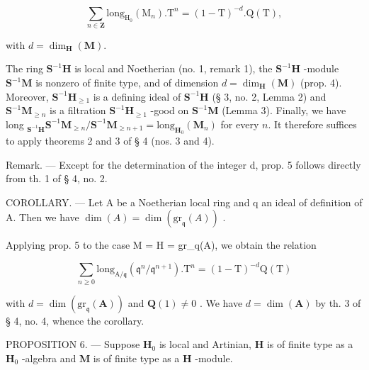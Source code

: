 \[
\sum_ {n \in \mathbf {Z}} \mathrm{long} _ {\mathrm{H} _ {0}} (\mathrm{M} _ {n}). \mathrm{T} ^ {n} = (1 - \mathrm{T}) ^ {- d}. \mathrm{Q} (\mathrm{T}),
\]

with \(d = \dim_{\mathbf{H}}(\mathbf{M})\).

The ring \(\mathbf{S}^{-1}\mathbf{H}\) is local and Noetherian (no. 1, remark 1), the \(\mathbf{S}^{-1}\mathbf{H}\) -module \(\mathbf{S}^{-1}\mathbf{M}\) is nonzero of finite type, and of dimension \(d = \dim_{\mathbf{H}}(\mathbf{M})\) (prop. 4). Moreover, \(\mathbf{S}^{-1}\mathbf{H}_{\geqslant 1}\) is a defining ideal of \(\mathbf{S}^{-1}\mathbf{H}\) (§ 3, no. 2, Lemma 2) and \(\mathbf{S}^{-1}\mathbf{M}_{\geqslant n}\) is a filtration \(\mathbf{S}^{-1}\mathbf{H}_{\geqslant 1}\) -good on \(\mathbf{S}^{-1}\mathbf{M}\) (Lemma 3). Finally, we have long \(_{\mathbf{S}^{-1}\mathbf{H}}\mathbf{S}^{-1}\mathbf{M}_{\geqslant n}/\mathbf{S}^{-1}\mathbf{M}_{\geqslant n+1} = \text{long}_{\mathbf{H}_0}(\mathbf{M}_n)\) for every \(n\). It therefore suffices to apply theorems 2 and 3 of § 4 (nos. 3 and 4).

Remark. --- Except for the determination of the integer d, prop. 5 follows directly from th. 1 of § 4, no. 2.

COROLLARY. --- Let A be a Noetherian local ring and q an ideal of definition of A. Then we have \(\dim(A) = \dim(\text{gr}_{\mathfrak{q}}(A))\) .

Applying prop. 5 to the case M = H = gr\_q(A), we obtain the relation

\[
\sum_ {n \geqslant 0} \mathrm{long} _ {\mathrm{A} / \mathfrak {q}} (\mathfrak {q} ^ {n} / \mathfrak {q} ^ {n + 1}). \mathrm{T} ^ {n} = (1 - \mathrm{T}) ^ {- d} \mathrm{Q} (\mathrm{T})
\]

with \(d = \dim(\mathrm{gr}_{\mathfrak{q}}(\mathbf{A}))\) and \(\mathbf{Q}(1) \neq 0\) . We have \(d = \dim(\mathbf{A})\) by th. 3 of § 4, no. 4, whence the corollary.

PROPOSITION 6. --- Suppose \(\mathbf{H}_{0}\) is local and Artinian, \(\mathbf{H}\) is of finite type as a \(\mathbf{H}_{0}\) -algebra and \(\mathbf{M}\) is of finite type as a \(\mathbf{H}\) -module.

